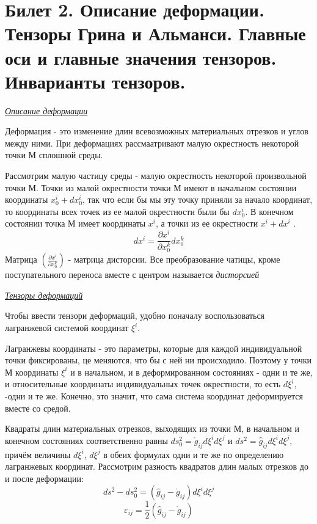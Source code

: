 \newpage
\section{Билет 2. Описание деформации. Тензоры Грина и Альманси. Главные оси и главные значения тензоров. Инварианты тензоров.}

\begin{center}
	\textit{\underline{Описание деформации}}
\end{center}

Деформация - это изменение длин всевозможных материальных отрезков и углов между ними. При деформациях рассмаатривают малую окрестность некоторой точки М сплошной среды. 

Рассмотрим малую частицу среды - малую окрестность некоторой произвольной точки М. Точки из малой окрестности точки М имеют в начальном состоянии координаты $x_0^i+dx_0^i$, так что если бы мы эту точку приняли за начало координат, то координаты всех точек из ее малой окрестности были бы $dx_0^i$. В конечном состоянии точка М имеет координаты $x^i$, а точки из ее окрестности $x^i+dx^i$ .
$$dx^i=\frac{\partial x^i}{\partial x_0^k}dx_0^k$$
Матрица $\left( \frac {\partial x^i}{\partial x_0^k}\right)$ - матрица дисторсии. Все преобразование чатицы, кроме поступательного переноса вместе с центром называется \textit{дисторсией}

\begin{center}
	\textit{\underline{Тензоры деформаций}}
\end{center}
Чтобы ввести тензори деформаций, удобно поначалу воспользоваться лагранжевой системой координат $\xi^i$.

Лагранжевы координаты - это параметры, которые для каждой индивидуальной точки фиксированы, це меняются, что бы с ней ни происходило. Поэтому у точки М координаты $\xi^i$ и в начальном, и в деформированном состояниях - одни и те же, и относительные координаты индивидуальных точек окрестности, то есть $d\xi^i$, -одни и те же. Конечно, это значит, что сама система координат деформируется вместе со средой. 

Квадраты длин материальных отрезков, выходящих из точки М, в начальном и конечном состояниях соответственно равны $ds_0^2 = \mathring{g}_{ij}d\xi^id\xi^j$ и $ds^2 = \hat{g}_{ij}d\xi^id\xi^j$, причём величины $d\xi^i$, $d\xi^j$ в обеих формулах одни и те же по определению лагранжевых координат. Рассмотрим разность квадратов длин малых отрезков до и после деформации: $$ds^2 - ds_0^2 = (\hat{g}_{ij} - \mathring{g}_{ij})d\xi^id\xi^j$$
$$\varepsilon_{ij} = \frac{1}{2}(\hat{g}_{ij} - \mathring{g}_{ij})$$

